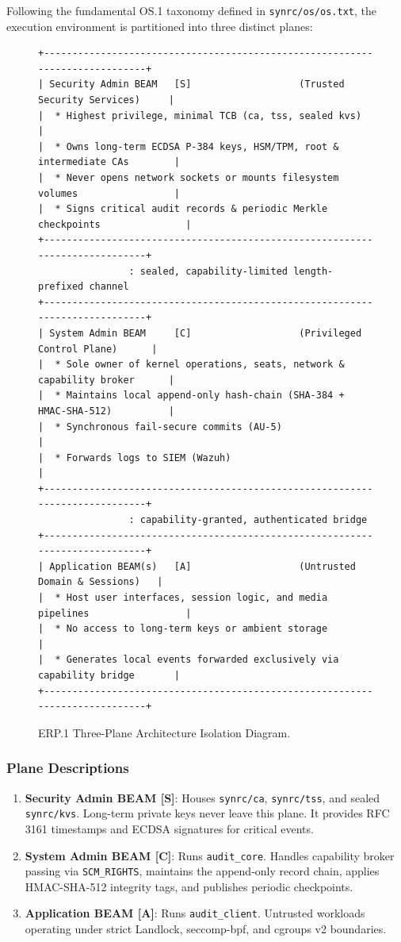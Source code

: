 \documentclass{article}
\begin{document}
Following the fundamental OS.1 taxonomy defined in \texttt{synrc/os/os.txt},
the execution environment is partitioned into three distinct planes:

\begin{figure}[ht!]
\centering
\begin{lstlisting}
+-----------------------------------------------------------------------------+
| Security Admin BEAM   [S]                   (Trusted Security Services)     |
|  * Highest privilege, minimal TCB (ca, tss, sealed kvs)                     |
|  * Owns long-term ECDSA P-384 keys, HSM/TPM, root & intermediate CAs        |
|  * Never opens network sockets or mounts filesystem volumes                 |
|  * Signs critical audit records & periodic Merkle checkpoints               |
+-----------------------------------------------------------------------------+
                : sealed, capability-limited length-prefixed channel
+-----------------------------------------------------------------------------+
| System Admin BEAM     [C]                   (Privileged Control Plane)      |
|  * Sole owner of kernel operations, seats, network & capability broker      |
|  * Maintains local append-only hash-chain (SHA-384 + HMAC-SHA-512)          |
|  * Synchronous fail-secure commits (AU-5)                                   |
|  * Forwards logs to SIEM (Wazuh)                                            |
+-----------------------------------------------------------------------------+
                : capability-granted, authenticated bridge
+-----------------------------------------------------------------------------+
| Application BEAM(s)   [A]                   (Untrusted Domain & Sessions)   |
|  * Host user interfaces, session logic, and media pipelines                 |
|  * No access to long-term keys or ambient storage                           |
|  * Generates local events forwarded exclusively via capability bridge       |
+-----------------------------------------------------------------------------+
\end{lstlisting}
\caption{ERP.1 Three-Plane Architecture Isolation Diagram.}
\end{figure}

\subsubsection{Plane Descriptions}
\begin{enumerate}
    \item \textbf{Security Admin BEAM [S]}: Houses \texttt{synrc/ca}, \texttt{synrc/tss}, and sealed \texttt{synrc/kvs}. Long-term private keys never leave this plane. It provides RFC 3161 timestamps and ECDSA signatures for critical events.
    \item \textbf{System Admin BEAM [C]}: Runs \texttt{audit\_core}. Handles capability broker passing via \texttt{SCM\_RIGHTS}, maintains the append-only record chain, applies HMAC-SHA-512 integrity tags, and publishes periodic checkpoints.
    \item \textbf{Application BEAM [A]}: Runs \texttt{audit\_client}. Untrusted workloads operating under strict Landlock, seccomp-bpf, and cgroups v2 boundaries.
\end{enumerate}
\end{document}
